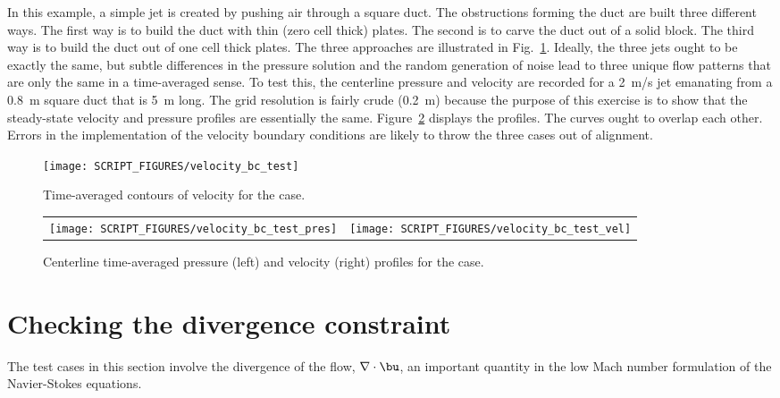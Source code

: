 \documentclass[11pt]{book}
\begin{document}
In this example, a simple jet is created by pushing air through a square duct. The obstructions forming the duct are built three different ways. The first way is to build the duct with thin (zero cell thick) plates. The second is to carve the duct out of a solid block. The third way is to build the duct out of one cell thick plates. The three approaches are illustrated in Fig.~\ref{velocity_bc_test_image}. Ideally, the three jets ought to be exactly the same, but subtle differences in the pressure solution and the random generation of noise lead to three unique flow patterns that are only the same in a time-averaged sense. To test this, the centerline pressure and velocity are recorded for a 2~m/s jet emanating from a 0.8~m square duct that is 5~m long. The grid resolution is fairly crude (0.2~m) because the purpose of this exercise is to show that the steady-state velocity and pressure profiles are essentially the same. Figure~\ref{velocity_bc_test_plot} displays the profiles. The curves ought to overlap each other. Errors in the implementation of the velocity boundary conditions are likely to throw the three cases out of alignment.

\begin{figure}[!ht]
\centering
\texttt{[image: SCRIPT\_FIGURES/velocity\_bc\_test]}
\caption[Images of the  test case]{Time-averaged contours of velocity for the  case.}
\label{velocity_bc_test_image}
\end{figure}

\begin{figure}[!ht]
\begin{tabular*}{\textwidth}{lr}
\texttt{[image: SCRIPT\_FIGURES/velocity\_bc\_test\_pres]} &
\texttt{[image: SCRIPT\_FIGURES/velocity\_bc\_test\_vel]}
\end{tabular*}
\caption[The  test case]{Centerline time-averaged pressure (left) and velocity (right) profiles for the  case.}
\label{velocity_bc_test_plot}
\end{figure}


\section{Checking the divergence constraint}
\label{divergence_test}

The test cases in this section involve the divergence of the flow, $\nabla \cdot \bu$, an important quantity in the low Mach number formulation of the Navier-Stokes equations.
\end{document}
